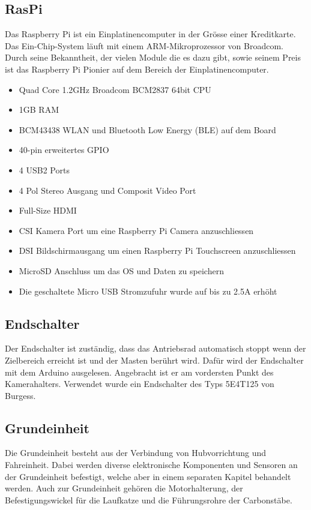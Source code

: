 \documentclass[a4paper]{report}
\begin{document}
\subsection{RasPi}
Das Raspberry Pi ist ein Einplatinencomputer in der Grösse einer Kreditkarte. Das Ein-Chip-System läuft mit einem ARM-Mikroprozessor von Broadcom. Durch seine Bekanntheit, der vielen Module die es dazu gibt, sowie seinem Preis ist das Raspberry Pi Pionier auf dem Bereich der Einplatinencomputer.

\begin{itemize}[noitemsep]
	\item Quad Core 1.2GHz Broadcom BCM2837 64bit CPU
	\item 1GB RAM
	\item BCM43438 WLAN und Bluetooth Low Energy (BLE) auf dem Board
	\item 40-pin erweitertes GPIO
	\item 4 USB2 Ports
	\item 4 Pol Stereo Ausgang und Composit Video Port
	\item Full-Size HDMI
	\item CSI Kamera Port um eine Raspberry Pi Camera anzuschliessen
	\item DSI Bildschirmausgang um einen Raspberry Pi Touchscreen anzuschliessen
	\item MicroSD Anschluss um das OS und Daten zu speichern
	\item Die geschaltete Micro USB Stromzufuhr wurde auf bis zu 2.5A erhöht
\end{itemize}\parencite{RaspberryPiFoundation2017}

\vspace{1em}

\subsection{Endschalter}
Der Endschalter ist zuständig, dass das Antriebsrad automatisch stoppt wenn der Zielbereich erreicht ist und der Masten berührt wird. Dafür wird der Endschalter mit dem Arduino ausgelesen. Angebracht ist er am vordersten Punkt des Kamerahalters. Verwendet wurde ein Endschalter des Typs 5E4T125 von Burgess.

\subsection{Grundeinheit}
\label{ssec:GrundeinheitBeschrieb}
Die Grundeinheit besteht aus der Verbindung von Hubvorrichtung und Fahreinheit. Dabei werden diverse elektronische Komponenten und Sensoren an der Grundeinheit befestigt, welche aber in einem separaten Kapitel behandelt werden. Auch zur Grundeinheit gehören die Motorhalterung, der Befestigungswickel für die Laufkatze und die Führungsrohre der Carbonstäbe.
\end{document}
